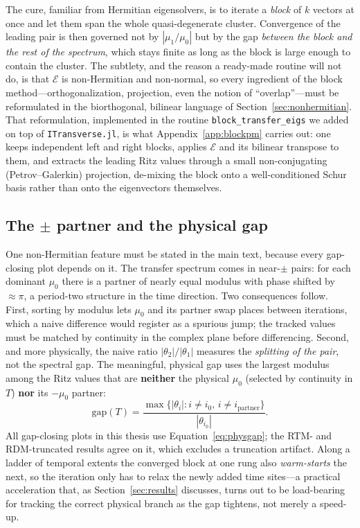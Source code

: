 The cure, familiar from Hermitian eigensolvers, is to iterate a \emph{block} of $k$ vectors at once and let them span the whole quasi-degenerate cluster. Convergence of the leading pair is then governed not by $|\mu_1/\mu_0|$ but by the gap \emph{between the block and the rest of the spectrum}, which stays finite as long as the block is large enough to contain the cluster. The subtlety, and the reason a ready-made routine will not do, is that $\mathcal{E}$ is non-Hermitian and non-normal, so every ingredient of the block method---orthogonalization, projection, even the notion of ``overlap''---must be reformulated in the biorthogonal, bilinear language of Section~\ref{sec:nonhermitian}. That reformulation, implemented in the routine \texttt{block\_transfer\_eigs} we added on top of \texttt{ITransverse.jl}, is what Appendix~\ref{app:blockpm} carries out: one keeps independent left and right blocks, applies $\mathcal{E}$ and its bilinear transpose to them, and extracts the leading Ritz values through a small non-conjugating (Petrov--Galerkin) projection, de-mixing the block onto a well-conditioned Schur basis rather than onto the eigenvectors themselves.

\subsection{The \texorpdfstring{$\pm$}{+/-} partner and the physical gap}

One non-Hermitian feature must be stated in the main text, because every gap-closing plot depends on it. The transfer spectrum comes in near-$\pm$ pairs: for each dominant $\mu_0$ there is a partner of nearly equal modulus with phase shifted by $\approx\pi$, a period-two structure in the time direction. Two consequences follow. First, sorting by modulus lets $\mu_0$ and its partner swap places between iterations, which a naive difference would register as a spurious jump; the tracked values must be matched by continuity in the complex plane before differencing. Second, and more physically, the naive ratio $|\theta_2|/|\theta_1|$ measures the \emph{splitting of the pair}, not the spectral gap. The meaningful, physical gap uses the largest modulus among the Ritz values that are \textbf{neither} the physical $\mu_0$ (selected by continuity in $T$) \textbf{nor} its $-\mu_0$ partner:
\begin{equation}
  \mathrm{gap}(T) = \frac{\max\{|\theta_i| : i \neq i_0,\, i \neq i_{\text{partner}}\}}{|\theta_{i_0}|}.
  \label{eq:physgap}
\end{equation}
All gap-closing plots in this thesis use Equation~\eqref{eq:physgap}; the RTM- and RDM-truncated results agree on it, which excludes a truncation artifact. Along a ladder of temporal extents the converged block at one rung also \emph{warm-starts} the next, so the iteration only has to relax the newly added time sites---a practical acceleration that, as Section~\ref{sec:results} discusses, turns out to be load-bearing for tracking the correct physical branch as the gap tightens, not merely a speed-up.

